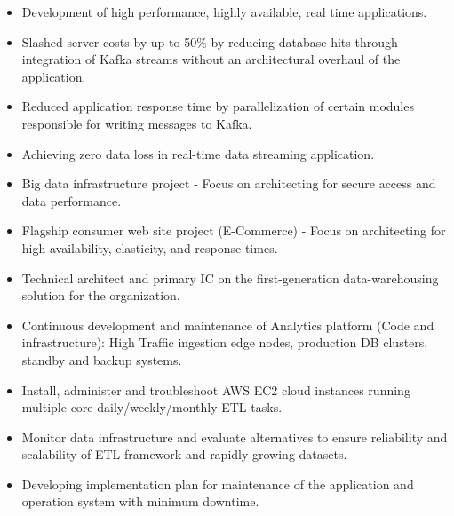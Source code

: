 \documentclass[10pt,a4paper,ragged2e]{altacv}
\begin{document}
\vspace{10px}

\begin{itemize}
    \item Development of high performance, highly available, real time applications.
    \item Slashed server costs by up to 50\% by reducing database hits through integration of Kafka streams without an architectural overhaul of the application. 
    \item Reduced application response time by parallelization of certain modules responsible for writing messages to Kafka.
    \item Achieving zero data loss in real-time data streaming application. 
\end{itemize}

\begin{itemize}
    \item Big data infrastructure project - Focus on architecting for secure access and data performance.
    \item Flagship consumer web site project (E-Commerce) - Focus on architecting for high availability, elasticity, and response times.
    \item Technical architect and primary IC on the first-generation data-warehousing solution for the organization.
    \item Continuous development and maintenance of Analytics platform (Code and infrastructure): High Traffic ingestion edge nodes, production DB clusters, standby and backup systems.
    \item Install, administer and troubleshoot AWS EC2 cloud instances running multiple core daily/weekly/monthly ETL tasks.
    \item Monitor data infrastructure and evaluate alternatives to ensure reliability and scalability of ETL framework and rapidly growing datasets.
    \item Developing implementation plan for maintenance of the application and operation system with minimum downtime.
\end{itemize}

\vspace{10px}
\end{document}
